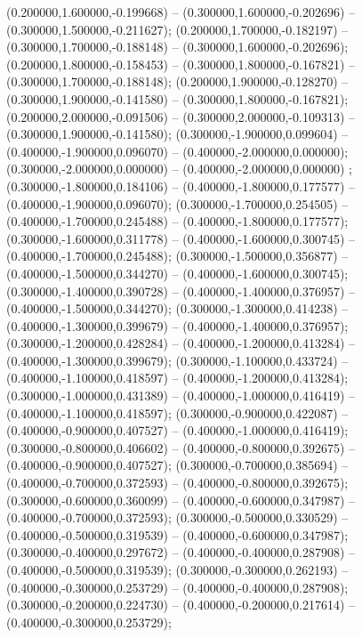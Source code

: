  (0.200000,1.600000,-0.199668) -- (0.300000,1.600000,-0.202696) -- (0.300000,1.500000,-0.211627);
 (0.200000,1.700000,-0.182197) -- (0.300000,1.700000,-0.188148) -- (0.300000,1.600000,-0.202696);
 (0.200000,1.800000,-0.158453) -- (0.300000,1.800000,-0.167821) -- (0.300000,1.700000,-0.188148);
 (0.200000,1.900000,-0.128270) -- (0.300000,1.900000,-0.141580) -- (0.300000,1.800000,-0.167821);
 (0.200000,2.000000,-0.091506) -- (0.300000,2.000000,-0.109313) -- (0.300000,1.900000,-0.141580);
 (0.300000,-1.900000,0.099604) -- (0.400000,-1.900000,0.096070) -- (0.400000,-2.000000,0.000000);
 (0.300000,-2.000000,0.000000) -- (0.400000,-2.000000,0.000000) ;
 (0.300000,-1.800000,0.184106) -- (0.400000,-1.800000,0.177577) -- (0.400000,-1.900000,0.096070);
 (0.300000,-1.700000,0.254505) -- (0.400000,-1.700000,0.245488) -- (0.400000,-1.800000,0.177577);
 (0.300000,-1.600000,0.311778) -- (0.400000,-1.600000,0.300745) -- (0.400000,-1.700000,0.245488);
 (0.300000,-1.500000,0.356877) -- (0.400000,-1.500000,0.344270) -- (0.400000,-1.600000,0.300745);
 (0.300000,-1.400000,0.390728) -- (0.400000,-1.400000,0.376957) -- (0.400000,-1.500000,0.344270);
 (0.300000,-1.300000,0.414238) -- (0.400000,-1.300000,0.399679) -- (0.400000,-1.400000,0.376957);
 (0.300000,-1.200000,0.428284) -- (0.400000,-1.200000,0.413284) -- (0.400000,-1.300000,0.399679);
 (0.300000,-1.100000,0.433724) -- (0.400000,-1.100000,0.418597) -- (0.400000,-1.200000,0.413284);
 (0.300000,-1.000000,0.431389) -- (0.400000,-1.000000,0.416419) -- (0.400000,-1.100000,0.418597);
 (0.300000,-0.900000,0.422087) -- (0.400000,-0.900000,0.407527) -- (0.400000,-1.000000,0.416419);
 (0.300000,-0.800000,0.406602) -- (0.400000,-0.800000,0.392675) -- (0.400000,-0.900000,0.407527);
 (0.300000,-0.700000,0.385694) -- (0.400000,-0.700000,0.372593) -- (0.400000,-0.800000,0.392675);
 (0.300000,-0.600000,0.360099) -- (0.400000,-0.600000,0.347987) -- (0.400000,-0.700000,0.372593);
 (0.300000,-0.500000,0.330529) -- (0.400000,-0.500000,0.319539) -- (0.400000,-0.600000,0.347987);
 (0.300000,-0.400000,0.297672) -- (0.400000,-0.400000,0.287908) -- (0.400000,-0.500000,0.319539);
 (0.300000,-0.300000,0.262193) -- (0.400000,-0.300000,0.253729) -- (0.400000,-0.400000,0.287908);
 (0.300000,-0.200000,0.224730) -- (0.400000,-0.200000,0.217614) -- (0.400000,-0.300000,0.253729);
